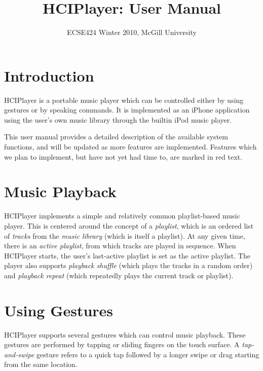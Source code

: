 \documentclass[12pt,letterpaper]{article}
\begin{document}
\title{HCIPlayer: User Manual}
\author{ECSE424 Winter 2010, McGill University}
\renewcommand{\today}{Updated: Monday, March 8th, 2010}
\maketitle

\section{Introduction}

HCIPlayer is a portable music player which can be controlled either by using gestures or by speaking commands. It is implemented as an iPhone application using the user's own music library through the builtin iPod music player.

This user manual provides a detailed description of the available system functions, and will be updated as more features are implemented. Features which we plan to implement, but have not yet had time to, are {\color{red} marked in red text}.

\section{Music Playback}

HCIPlayer implements a simple and relatively common playlist-based music player. This is centered around the concept of a \emph{playlist}, which is an ordered list of \emph{tracks} from the \emph{music library} (which is itself a playlist). At any given time, there is an \emph{active playlist}, from which tracks are played in sequence. When HCIPlayer starts, the user's last-active playlist is set as the active playlist. The player also supports \emph{playback shuffle} (which plays the tracks in a random order) and \emph{playback repeat} (which repeatedly plays the current track or playlist).

\section{Using Gestures}

HCIPlayer supports several gestures which can control music playback. These gestures are performed by tapping or sliding fingers on the touch surface. A \emph{tap-and-swipe} gesture refers to a quick tap followed by a longer swipe or drag starting from the same location.
\end{document}
